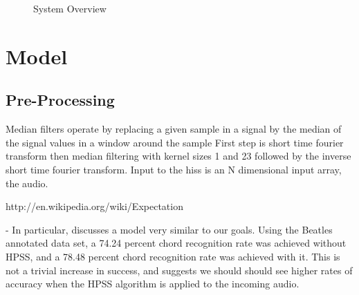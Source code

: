 \documentclass{article}
\begin{document}
\begin{figure}
\caption{System Overview}
\label{fig:overview}
\end{figure}

\section{Model}

\subsection{Pre-Processing}
Median ﬁlters operate by replacing a given sample in a signal by the median of 
the signal values in a window around the sample \cite{FitzGerald:11} First step 
is short time fourier transform then median filtering with kernel sizes 1 and 23 
followed by the inverse short time fourier transform. Input to the hiss is an N 
dimensional input array, the audio.

http://en.wikipedia.org/wiki/Expectation%



- In particular, \cite{Ueda:19} discusses a model
very similar to our goals. Using the Beatles annotated data set, a 74.24
percent chord recognition rate was achieved without HPSS, and a 78.48 percent
chord recognition rate was achieved with it. This is not a trivial increase in
success, and suggests we should should see higher rates of accuracy when the
HPSS algorithm is applied to the incoming audio.
\end{document}
